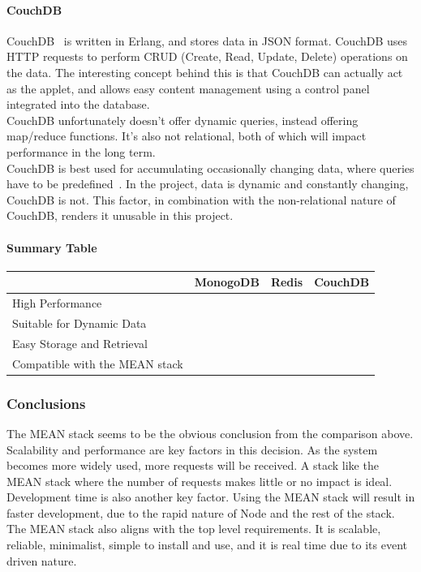 \documentclass[draft,preprint,12pt,3p]{elsarticle}
\newcommand{\checkmark}{\ding{51}}%
\newcommand{\xmark}{\ding{55}}%
\begin{document}
\paragraph{CouchDB}
CouchDB~\cite{couchdb} is written in Erlang, and stores data in JSON format. CouchDB uses HTTP requests to perform CRUD (Create, Read, Update, Delete) operations on the data. 
The interesting concept behind this is that CouchDB can actually act as the applet, and allows easy content management using a control panel integrated into the database.\\
CouchDB unfortunately doesn't offer dynamic queries, instead offering map/reduce functions. It's also not relational, both of which will impact performance in the long term.\\
CouchDB is best used for accumulating occasionally changing data, where queries have to be predefined~\cite{databasecomparison}. In the project, data is dynamic and constantly changing, CouchDB is not. This factor, in combination with the non-relational nature of CouchDB, renders it unusable in this project.

\paragraph{Summary Table}
\begin{tabular}{| l | l | l | l |}
    \hline
          & MonogoDB & Redis & CouchDB \\ \hline
    High Performance & \checkmark & \checkmark & \xmark\\ \hline
    Suitable for Dynamic Data & \checkmark & \checkmark & \xmark\\ \hline
    Easy Storage and Retrieval & \checkmark & \xmark & \checkmark\\ \hline
    Compatible with the MEAN stack & \checkmark & \checkmark & \checkmark\\ \hline
\end{tabular}

\subsubsection{Conclusions}
The MEAN stack seems to be the obvious conclusion from the comparison above. Scalability and performance are key factors in this decision. As the system becomes more widely used, more requests will be received. A stack like the MEAN stack where the number of requests makes little or no impact is ideal.\\
Development time is also another key factor. Using the MEAN stack will result in faster development, due to the rapid nature of Node and the rest of the stack.\\
The MEAN stack also aligns with the top level requirements. It is scalable, reliable, minimalist, simple to install and use, and it is real time due to its event driven nature.
\end{document}
